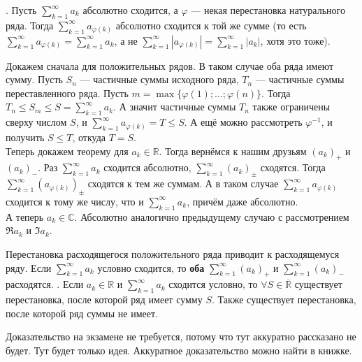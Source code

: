 \documentclass{article}
\begin{document}
\begin{itemize}
        \thm {}. Пусть $\sum\limits_{k=1}^\infty a_k$ абсолютно сходится, а $\varphi$ --- некая перестановка натурального ряда. Тогда $\sum\limits_{k=1}^\infty a_{\varphi(k)}$ абсолютно сходится к той же сумме (то есть $\sum\limits_{k=1}^\infty a_{\varphi(k)}=\sum\limits_{k=1}^\infty a_k$, а не $\sum\limits_{k=1}^\infty|a_{\varphi(k)}|=\sum\limits_{k=1}^\infty|a_k|$, хотя это тоже).
        \begin{Proof}
            Докажем сначала для положительных рядов. В таком случае оба ряда имеют сумму. Пусть $S_n$ --- частичные суммы исходного ряда, $T_n$ --- частичные суммы переставленного ряда. Пусть $m=\max\{\varphi(1);\ldots;\varphi(n)\}$. Тогда $T_n\leqslant S_m\leqslant S=\sum\limits_{k=1}^\infty a_k$. А значит частичные суммы $T_n$ также ограничены сверху числом $S$, и $\sum\limits_{k=1}^\infty a_{\varphi(k)}=T\leqslant S$. А ещё можно рассмотреть $\varphi^{-1}$, и получить $S\leqslant T$, откуда $T=S$.\\
            Теперь докажем теорему для $a_k\in\mathbb R$. Тогда вернёмся к нашим друзьям $(a_k)_+$ и $(a_k)_-$. Раз $\sum\limits_{k=1}^\infty a_k$ сходится абсолютно, $\sum\limits_{k=1}^\infty (a_k)_\pm$ сходятся. Тогда $\sum\limits_{k=1}^\infty (a_{\varphi(k)})_\pm$ сходятся к тем же суммам. А в таком случае $\sum\limits_{k=1}^\infty a_{\varphi(k)}$ сходится к тому же числу, что и $\sum\limits_{k=1}^\infty a_k$, причём даже абсолютно.\\
            А теперь $a_k\in\mathbb C$. Абсолютно аналогично предыдущему случаю с рассмотрением $\Re a_k$ и $\Im a_k$.
        \end{Proof}
        \thm Перестановка расходящегося положительного ряда приводит к расходящемуся ряду.
        \thm Если $\sum\limits_{k=1}^\infty a_k$ условно сходится, то \textbf{оба} $\sum\limits_{k=1}^\infty (a_k)_+$ и $\sum\limits_{k=1}^\infty (a_k)_-$ расходятся.
        \thm {}. Если $a_k\in\mathbb R$ и $\sum\limits_{k=1}^\infty a_k$ сходится условно, то $\forall S\in\overline{\mathbb R}$ существует перестановка, после которой ряд имеет сумму $S$. Также существует перестановка, после которой ряд суммы не имеет.
        \begin{Comment}
            Доказательство на экзамене не требуется, потому что тут аккуратно рассказано не будет. Тут будет только идея. Аккуратное доказательство можно найти в книжке.
        \end{Comment}
        \begin{Proof}

\end{Proof}
\end{itemize}
\end{document}
